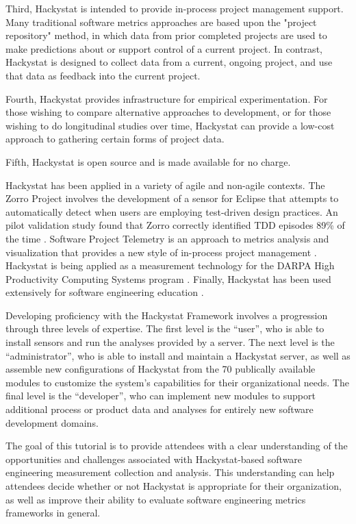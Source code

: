 \documentclass[runningheads]{llncs}
\begin{document}
Third, Hackystat is intended to provide in-process project management
support. Many traditional software metrics approaches are based upon the
"project repository" method, in which data from prior completed projects
are used to make predictions about or support control of a current
project. In contrast, Hackystat is designed to collect data from a current,
ongoing project, and use that data as feedback into the current project.

Fourth, Hackystat provides infrastructure for empirical experimentation. For
those wishing to compare alternative approaches to development, or for
those wishing to do longitudinal studies over time, Hackystat can provide a
low-cost approach to gathering certain forms of project data.
 
Fifth, Hackystat is open source and is made available for no charge.

Hackystat has been applied in a variety of agile and non-agile contexts.
The Zorro Project involves the development of a sensor for Eclipse that
attempts to automatically detect when users are employing test-driven
design practices. An pilot validation study found that Zorro correctly
identified TDD episodes 89\% of the time \cite{csdl2-06-02}.  Software
Project Telemetry is an approach to metrics analysis and visualization that
provides a new style of in-process project management \cite{csdl2-04-11}.
Hackystat is being applied as a measurement technology for the DARPA High
Productivity Computing Systems program \cite{csdl2-04-22}.  Finally,
Hackystat has been used extensively for software engineering education
\cite{csdl2-03-12}.

Developing proficiency with the Hackystat Framework involves a progression
through three levels of expertise. The first level is the ``user'', who is
able to install sensors and run the analyses provided by a server.  The
next level is the ``administrator'', who is able to install and maintain a
Hackystat server, as well as assemble new configurations of Hackystat from
the 70 publically available modules to customize the system's capabilities
for their organizational needs.  The final level is the ``developer'', who
can implement new modules to support additional process or product data and
analyses for entirely new software development domains.

The goal of this tutorial is to provide attendees with a clear
understanding of the opportunities and challenges associated with
Hackystat-based software engineering measurement collection and analysis.
This understanding can help attendees decide whether or not Hackystat is
appropriate for their organization, as well as improve their ability to evaluate
software engineering metrics frameworks in general. 
\end{document}

